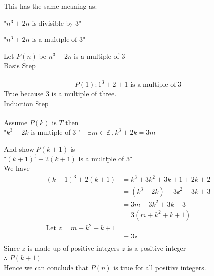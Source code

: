 \documentclass[12pt letter]{report}
\begin{document}
\begin{myproof}

  This has the same meaning as:

  "$n^3 + 2n$ is divisible by 3"

  "$n^3 + 2n$ is a multiple of 3"

  Let $P \left( n \right) $ be $n^3 +2n$ is a multiple of 3 \\

  \noindent \underline{Basis Step} \\
  \\

  \[
    P \left( 1 \right) : 1^3 + 2 + 1 \text{ is a multiple of 3}
  \]
  True because 3 is a multiple of three. \\

  \noindent \underline{Induction  Step} \\
  \\
  Assume $P \left( k \right) $ is $T$ then \\

  "$k^3 + 2k$ is multiple of 3 " -  $\exists m \in \mathbb{Z} \, , k^3 + 2k = 3m $


  \noindent And show $P \left( k + 1 \right) $ is \\

  "$\left( k + 1 \right)^3 + 2 \left( k + 1 \right)  $ is a multiple of 3" \\


  \noindent   We have \\
  \begin{align*}
    \left( k + 1 \right) ^3 + 2 \left( k + 1 \right) & = k^3 + 3k^2 + 3k + 1 + 2k + 2            \\
                                                     & = \left( k^3 + 2k \right) + 3k^2 + 3k + 3 \\
                                                     & = 3m + 3k^2 + 3k + 3                      \\
                                                     & = 3 \left( m + k^2 + k + 1 \right)        \\
    \text{Let } z = m + k^2 + k + 1                                                              \\
                                                     & = 3z                                      \\
  \end{align*}
  Since $z$ is made up of positive integers $z$ is a positive integer\\
  $\therefore$ $P \left( k + 1 \right) $\\
  Hence we can conclude that $P \left( n \right) $ is true for all positive integers.


\end{myproof}
\end{document}
